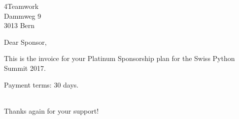 \documentclass[SN,11pt,enlargefirstpage=true,sps]{scrlttr2}
\begin{document}
\begin{letter}{4Teamwork\\Dammweg 9\\3013 Bern}

  \opening{Dear Sponsor,}

  This is the invoice for your Platinum Sponsorship plan for the Swiss Python Summit 2017.

  \begin{invoice}{0}%
  \end{invoice}

  Payment terms: 30 days.

  \closing{\\Thanks again for your support!}

\end{letter}
\end{document}
